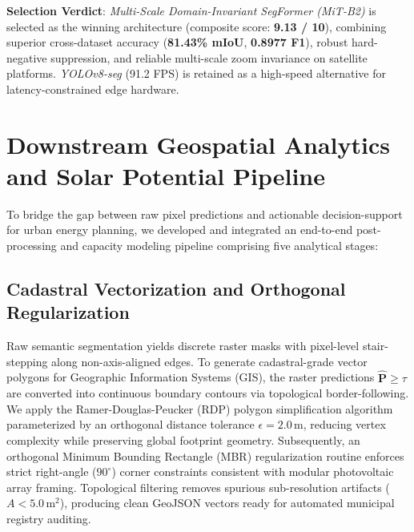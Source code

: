 \documentclass[conference]{IEEEtran}
\begin{document}
\textbf{Selection Verdict}: \textit{Multi-Scale Domain-Invariant SegFormer (MiT-B2)} is selected as the winning architecture (composite score: \textbf{9.13 / 10}), combining superior cross-dataset accuracy (\textbf{81.43\% mIoU}, \textbf{0.8977 F1}), robust hard-negative suppression, and reliable multi-scale zoom invariance on satellite platforms. \textit{YOLOv8-seg} (91.2 FPS) is retained as a high-speed alternative for latency-constrained edge hardware.

\FloatBarrier

\section{Downstream Geospatial Analytics and Solar Potential Pipeline}
To bridge the gap between raw pixel predictions and actionable decision-support for urban energy planning, we developed and integrated an end-to-end post-processing and capacity modeling pipeline comprising five analytical stages:

\subsection{Cadastral Vectorization and Orthogonal Regularization}
Raw semantic segmentation yields discrete raster masks with pixel-level stair-stepping along non-axis-aligned edges. To generate cadastral-grade vector polygons for Geographic Information Systems (GIS), the raster predictions $\hat{\mathbf{P}} \ge \tau$ are converted into continuous boundary contours via topological border-following. We apply the Ramer-Douglas-Peucker (RDP) polygon simplification algorithm parameterized by an orthogonal distance tolerance $\epsilon = 2.0\,\text{m}$, reducing vertex complexity while preserving global footprint geometry. Subsequently, an orthogonal Minimum Bounding Rectangle (MBR) regularization routine enforces strict right-angle ($90^\circ$) corner constraints consistent with modular photovoltaic array framing. Topological filtering removes spurious sub-resolution artifacts ($A < 5.0\,\text{m}^2$), producing clean GeoJSON vectors ready for automated municipal registry auditing.
\end{document}
